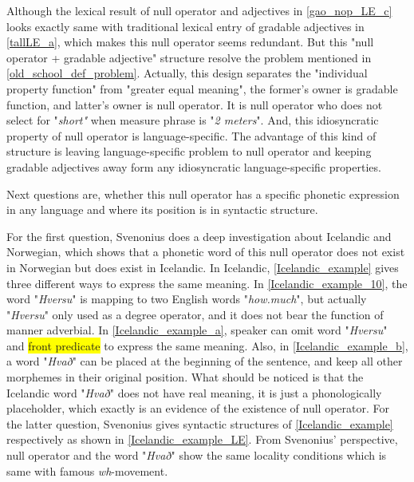 \documentclass{ctexart}
\begin{document}
\noindent
Although the lexical result of null operator and adjectives in \ref{gao_nop_LE_c} looks exactly same with traditional lexical entry of gradable adjectives in \ref{tallLE_a}, which makes this null operator seems redundant. But this "null operator + gradable adjective" structure resolve the problem mentioned in \ref{old_school_def_problem}. Actually, this design separates the "individual property function" from "greater equal meaning", the former's owner is gradable function, and latter's owner is null operator. It is null operator who does not select for "\textit{short"} when measure phrase is "\textit{2 meters}". And, this idiosyncratic property of null operator is language-specific. The advantage of this kind of structure is leaving language-specific problem to null operator and keeping gradable adjectives away form any idiosyncratic language-specific properties.

Next questions are, whether this null operator has a specific phonetic expression in any language and where its position is in syntactic structure. 

For the first question, Svenonius does a deep investigation about Icelandic and Norwegian, which shows that a phonetic word of this null operator does not exist in Norwegian but does exist in Icelandic. In Icelandic, \ref{Icelandic_example} gives three different ways to express the same meaning. In \ref{Icelandic_example_10}, the word "\textit{Hversu}" is mapping to two English words "\textit{how.much}", but actually "\textit{Hversu}" only used as a degree operator, and it does not bear the function of manner adverbial. In \ref{Icelandic_example_a}, speaker can omit word "\textit{Hversu}" and \colorbox{yellow}{front predicate} to express the same meaning. Also, in \ref{Icelandic_example_b}, a word "\textit{Hvað}" can be placed at the beginning of the sentence, and keep all other morphemes in their original position. What should be noticed is that the Icelandic word "\textit{Hvað}" does not have real meaning, it is just a phonologically placeholder, which exactly is an evidence of the existence of null operator. For the latter question, Svenonius gives syntactic structures of \ref{Icelandic_example} respectively as shown in \ref{Icelandic_example_LE}. From Svenonius' perspective, null operator and the word "\textit{Hvað}" show the same locality conditions which is same with famous \textit{wh}-movement. 
\end{document}
